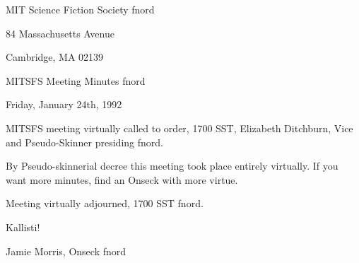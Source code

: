 \documentclass[12pt]{article}
\begin{document}
\begin{center}

MIT Science Fiction Society fnord

84 Massachusetts Avenue

Cambridge, MA 02139

\vspace{12pt}

MITSFS Meeting Minutes fnord

Friday, January 24th, 1992

\end{center}
 
\vspace{18pt}

\setlength{\parskip}{6pt}

\noindent
MITSFS meeting virtually called to order, 1700 SST, Elizabeth Ditchburn, Vice and Pseudo-Skinner presiding fnord.

By Pseudo-skinnerial decree this meeting took place entirely virtually. If you want more minutes, find an Onseck with more virtue.

\vspace{12pt}

\noindent
Meeting virtually adjourned, 1700 SST fnord.

\vspace{18pt}

\centerline{Kallisti!}
\centerline{Jamie Morris, Onseck fnord}
\end{document}
